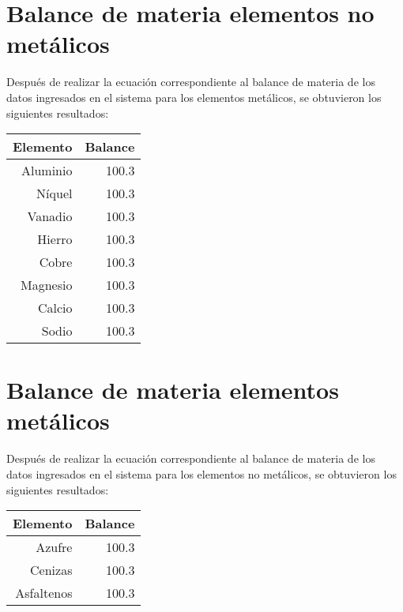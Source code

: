 \documentclass[12pt]{article}
\begin{document}
\section*{Balance de materia elementos no metálicos}
\vspace{20 pt}
Después de realizar la ecuación correspondiente al balance de materia de los datos ingresados en el sistema para los elementos metálicos, se obtuvieron los siguientes resultados: \\ 
\vspace{20 pt}
\begin{table}[H]
  \centering
    \begin{tabular}{|r|r|}
    \hline
    Elemento & Balance \\
    \hline\hline
    Aluminio &  100.3 \\
    Níquel  &  100.3 \\
    Vanadio &  100.3\\
    Hierro & 100.3 \\
    Cobre  &  100.3 \\
    Magnesio &  100.3 \\
    Calcio &  100.3 \\
    Sodio &  100.3 \\
    \hline
    \end{tabular}%
\end{table}%
\vspace{30 pt}
\section*{Balance de materia elementos metálicos}
\vspace{20 pt}
Después de realizar la ecuación correspondiente al balance de materia de los datos ingresados en el sistema para los elementos no metálicos, se obtuvieron los siguientes resultados: \\
\vspace{20 pt}
\begin{large}
\begin{table}[H]
  \centering
    \begin{tabular}{|r|r|}
    \hline
    Elemento & Balance \\
    \hline\hline
    Azufre &  100.3 \\
    Cenizas  &  100.3 \\
    Asfaltenos & 100.3 \\
    \hline
    \end{tabular}%
\end{table}%
\end{large}
\end{document}

